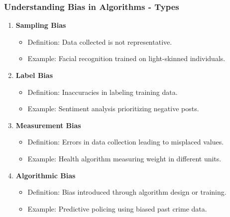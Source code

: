 \documentclass{beamer}
\begin{document}
\begin{frame}[fragile]
    \frametitle{Understanding Bias in Algorithms - Types}
    \begin{enumerate}
        \item \textbf{Sampling Bias}
            \begin{itemize}
                \item Definition: Data collected is not representative.
                \item Example: Facial recognition trained on light-skinned individuals.
            \end{itemize}
        \item \textbf{Label Bias}
            \begin{itemize}
                \item Definition: Inaccuracies in labeling training data.
                \item Example: Sentiment analysis prioritizing negative posts.
            \end{itemize}
        \item \textbf{Measurement Bias}
            \begin{itemize}
                \item Definition: Errors in data collection leading to misplaced values.
                \item Example: Health algorithm measuring weight in different units.
            \end{itemize}
        \item \textbf{Algorithmic Bias}
            \begin{itemize}
                \item Definition: Bias introduced through algorithm design or training.
                \item Example: Predictive policing using biased past crime data.
            \end{itemize}
    \end{enumerate}
\end{frame}
\end{document}
